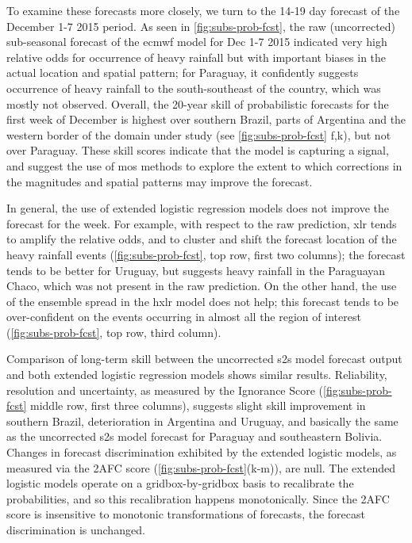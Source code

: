 \documentclass{ametsoc}
\begin{document}
To examine these forecasts more closely, we turn to the 14-19 day forecast of the December 1-7 2015 period.
As seen in \cref{fig:subs-prob-fcst}, the raw (uncorrected) sub-seasonal forecast of the \gls{ecmwf} model for Dec 1-7 2015 indicated very high relative odds for occurrence of heavy rainfall but with important biases in the actual location and spatial pattern; for Paraguay, it confidently suggests occurrence of heavy rainfall to the south-southeast of the country, which was mostly not observed.
Overall, the 20-year skill of probabilistic forecasts for the first week of December is highest over southern Brazil, parts of Argentina and the western border of the domain under study (see \cref{fig:subs-prob-fcst} f,k), but not over Paraguay.
These skill scores indicate that the model is capturing a signal, and suggest the use of \gls{mos} methods to explore the extent to which corrections in the magnitudes and spatial patterns may improve the forecast.

In general, the use of extended logistic regression models does not improve the forecast for the week.
For example, with respect to the raw prediction, \gls{xlr} tends to amplify the relative odds, and to cluster and shift the forecast location of the heavy rainfall events (\cref{fig:subs-prob-fcst}, top row, first two columns); the forecast tends to be better for Uruguay, but suggests heavy rainfall in the Paraguayan Chaco, which was not present in the raw prediction.
On the other hand, the use of the ensemble spread in the \gls{hxlr} model does not help; this forecast tends to be over-confident on the events occurring in almost all the region of interest (\cref{fig:subs-prob-fcst}, top row, third column).

Comparison of long-term skill between the uncorrected \gls{s2s} model forecast output and both extended logistic regression models shows similar results.
Reliability, resolution and uncertainty, as measured by the Ignorance Score (\cref{fig:subs-prob-fcst} middle row, first three columns), suggests slight skill improvement in southern Brazil, deterioration in Argentina and Uruguay, and basically the same as the uncorrected \gls{s2s} model forecast for Paraguay and southeastern Bolivia.
Changes in forecast discrimination exhibited by the extended logistic models, as measured via the 2AFC score (\cref{fig:subs-prob-fcst}(k-m)), are  null.
The extended logistic models operate on a gridbox-by-gridbox basis to recalibrate the probabilities, and so this recalibration happens monotonically.
Since the 2AFC score is insensitive to monotonic transformations of forecasts, the forecast discrimination is unchanged.
\end{document}
